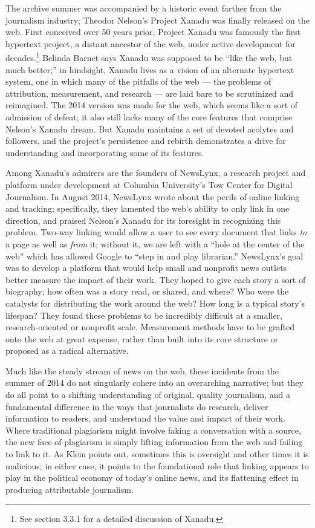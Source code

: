 The archive summer was accompanied by a historic event farther from the journalism industry; Theodor Nelson's Project Xanadu was finally released on the web. First conceived over 50 years prior, Project Xanadu was famously the first hypertext project, a distant ancestor of the web, under active development for decades.\footnote{See section 3.3.1 for a detailed discussion of Xanadu.} Belinda Barnet says Xanadu was supposed to be ``like the web, but much better;'' in hindsight, Xanadu lives as a vision of an alternate hypertext system, one in which many of the pitfalls of the web --- the problems of attribution, measurement, and research --- are laid bare to be scrutinized and reimagined.\autocite[``The Magical Place of Literary Memory: Xanadu'']{barnet_memory_2013} The 2014 version was made for the web, which seems like a sort of admission of defeat; it also still lacks many of the core features that comprise Nelson's Xanadu dream. But Xanadu maintains a set of devoted acolytes and followers, and the project's persistence and rebirth demonstrates a drive for understanding and incorporating some of its features.

Among Xanadu's admirers are the founders of NewsLynx, a research project and platform under development at Columbia University's Tow Center for Digital Journalism. In August 2014, NewsLynx wrote about the perils of online linking and tracking; specifically, they lamented the web's ability to only link in one direction, and praised Nelson's Xanadu for its foresight in recognizing this problem. Two-way linking would allow a user to see every document that links \emph{to} a page as well as \emph{from} it; without it, we are left with a ``hole at the center of the web'' which has allowed Google to ``step in and play librarian.''\autocite{abelson_hyper-compensation:_2014} NewsLynx's goal was to develop a platform that would help small and nonprofit news outlets better measure the impact of their work. They hoped to give each story a sort of biography; how often was a story read, or shared, and where? Who were the catalysts for distributing the work around the web? How long is a typical story's lifespan? They found these problems to be incredibly difficult at a smaller, research-oriented or nonprofit scale. Measurement methods have to be grafted onto the web at great expense, rather than built into its core structure or proposed as a radical alternative.

Much like the steady stream of news on the web, these incidents from the summer of 2014 do not singularly cohere into an overarching narrative; but they do all point to a shifting understanding of original, quality journalism, and a fundamental difference in the ways that journalists do research, deliver information to readers, and understand the value and impact of their work. Where traditional plagiarism might involve faking a conversation with a source, the new face of plagiarism is simply lifting information from the web and failing to link to it. As Klein points out, sometimes this is oversight and other times it is malicious; in either case, it points to the foundational role that linking appears to play in the political economy of today's online news, and its flattening effect in producing attributable journalism.

